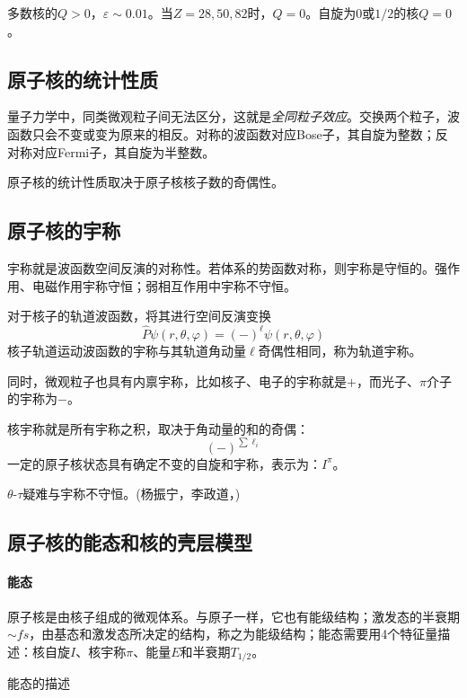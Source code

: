 多数核的$Q>0$，$\varepsilon\sim 0.01$。当$Z=28,50,82$时，$Q=0$。自旋为0或$1/2$的核$Q=0$。

\subsection{原子核的统计性质}
量子力学中，同类微观粒子间无法区分，这就是\textit{全同粒子效应}。交换两个粒子，波函数只会不变或变为原来的相反。对称的波函数对应Bose子，其自旋为整数；反对称对应Fermi子，其自旋为半整数。

原子核的统计性质取决于原子核核子数的奇偶性。

\subsection{原子核的宇称}
宇称就是波函数空间反演的对称性。若体系的势函数对称，则宇称是守恒的。强作用、电磁作用宇称守恒；弱相互作用中宇称不守恒。

对于核子的轨道波函数，将其进行空间反演变换
\[
	\hat P\psi(r,\theta,\varphi)=(-)^\ell\psi(r,\theta,\varphi)
\]
核子轨道运动波函数的宇称与其轨道角动量$\ell$奇偶性相同，称为轨道宇称。

同时，微观粒子也具有内禀宇称，比如核子、电子的宇称就是$+$，而光子、$\pi$介子的宇称为$-$。

核宇称就是所有宇称之积，取决于角动量的和的奇偶：
\[
	(-)^{\sum\ell_i}
\]
一定的原子核状态具有确定不变的自旋和宇称，表示为：$I^\pi$。

$\theta$-$\tau$疑难与宇称不守恒。(杨振宁，李政道，)

\subsection{原子核的能态和核的壳层模型}
\paragraph{能态}原子核是由核子组成的微观体系。与原子一样，它也有能级结构；激发态的半衰期$\sim\si{fs}$，由基态和激发态所决定的结构，称之为能级结构；能态需要用4个特征量描述：核自旋$I$、核宇称$\pi$、能量$E$和半衰期$T_{1/2}$。
\begin{center}
\tikzchap 能态的描述
\end{center}
